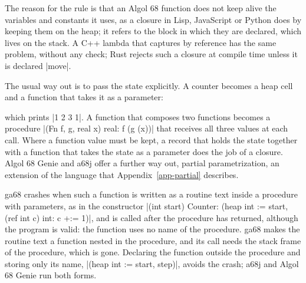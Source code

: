 The reason for the rule is that an Algol 68 function does not keep alive
the variables and constants it uses, as a closure in Lisp, JavaScript or
Python does by keeping them on the heap; it refers to the block in which
they are declared, which lives on the stack. A C++ lambda that captures by reference has the same
problem, without any check; Rust rejects such a closure at compile time
unless it is declared \code|move|.

The usual way out is to pass the state explicitly. A counter becomes a
heap cell and a function that takes it as a parameter:


\noindent which prints \code|1 2 3 1|. A function that composes two
functions becomes a procedure \code|(Fn f, g, real x) real: f (g (x))|
that receives all three values at each call. Where a function value must
be kept, a record that holds the state together with a function that
takes the state as a parameter does the job of a closure. Algol 68 Genie
and a68j offer a further way out, partial parametrization, an extension of
the language that Appendix~\ref{app-partial} describes.

\begin{implnote}
ga68 crashes when such a function is written as a routine text inside a
procedure with parameters, as in the constructor
\code|(int start) Counter: (heap int := start, (ref int c) int: c +:= 1)|,
and is called after the procedure has returned, although the program is
valid: the function uses no name of the procedure. ga68 makes the routine
text a function nested in the procedure, and its call needs the stack
frame of the procedure, which is gone. Declaring the function outside the
procedure and storing only its name, \code|(heap int := start, step)|,
avoids the crash; a68j and Algol 68 Genie run both forms.
\end{implnote}

